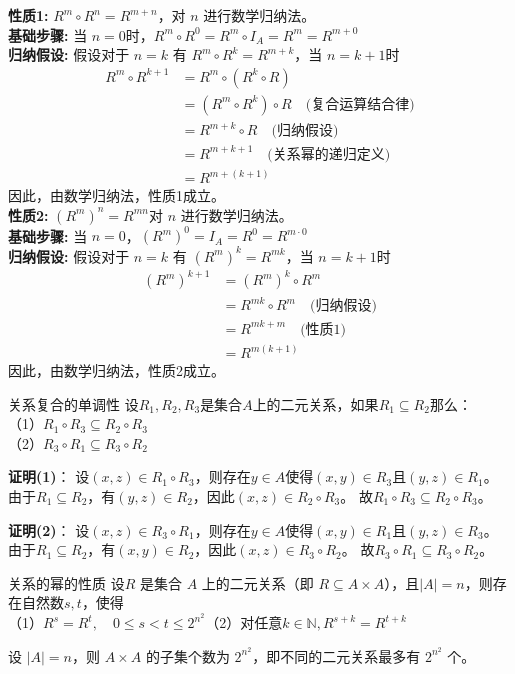 \documentclass[lang=cn,11pt]{elegantbook}
\begin{document}
\textbf{性质1:} \( R^m \circ R^n = R^{m+n} \)，对 \( n \) 进行数学归纳法。\\
\textbf{基础步骤:} 当 \( n = 0 \)时，$R^m \circ R^0 = R^m \circ I_A = R^m = R^{m+0}$\\
\textbf{归纳假设:} 假设对于 \( n = k \) 有 \( R^m \circ R^k = R^{m+k} \)，当 \( n = k+1 \)时
\begin{align*}
R^m \circ R^{k+1} &= R^m \circ (R^k \circ R) \\
&= (R^m \circ R^k) \circ R \quad \text{(复合运算结合律)} \\
&= R^{m+k} \circ R \quad \text{(归纳假设)} \\
&= R^{m+k+1} \quad \text{(关系幂的递归定义)} \\
&= R^{m+(k+1)}
\end{align*}
因此，由数学归纳法，性质1成立。\\
\textbf{性质2:} \( (R^m)^n = R^{mn} \)对 \( n \) 进行数学归纳法。\\
\textbf{基础步骤:} 当 \( n = 0 \)，$(R^m)^0 = I_A = R^0 = R^{m \cdot 0}$\\
\textbf{归纳假设:} 假设对于 \( n = k \) 有 \( (R^m)^k = R^{mk} \)，当 \( n = k+1 \)时
\begin{align*}
(R^m)^{k+1} &= (R^m)^k \circ R^m \\
&= R^{mk} \circ R^m \quad \text{(归纳假设)} \\
&= R^{mk + m} \quad \text{(性质1)} \\
&= R^{m(k+1)}
\end{align*}
因此，由数学归纳法，性质2成立。
\begin{theorem}{关系复合的单调性}
设$R_1,R_2,R_3$是集合$A$上的二元关系，如果$R_1\subseteq R_2$那么：\\
（1）$R_1\circ R_3\subseteq R_2\circ R_3$\\
（2）$R_3\circ R_1\subseteq R_3\circ R_2$
\end{theorem}
\textbf{证明(1)}：
设$(x,z)\in R_1\circ R_3$，则存在$y\in A$使得$(x,y)\in R_3$且$(y,z)\in R_1$。
由于$R_1\subseteq R_2$，有$(y,z)\in R_2$，因此$(x,z)\in R_2\circ R_3$。
故$R_1\circ R_3\subseteq R_2\circ R_3$。

\textbf{证明(2)}：
设$(x,z)\in R_3\circ R_1$，则存在$y\in A$使得$(x,y)\in R_1$且$(y,z)\in R_3$。
由于$R_1\subseteq R_2$，有$(x,y)\in R_2$，因此$(x,z)\in R_3\circ R_2$。
故$R_3\circ R_1\subseteq R_3\circ R_2$。
\begin{theorem}{关系的幂的性质}
    设\( R \) 是集合 \( A \) 上的二元关系（即 \( R \subseteq A \times A \)），且$|A|=n$，则存在自然数$s,t$，使得\\
    （1）$R^s=R^t,\quad 0\leq s<t\leq 2^{n^2}$\quad（2）对任意$k\in\mathbb{N},R^{s+k}=R^{t+k}$
\end{theorem}
设 $|A| = n$，则 $A \times A$ 的子集个数为 $2^{n^2}$，即不同的二元关系最多有 $2^{n^2}$ 个。
\end{document}

